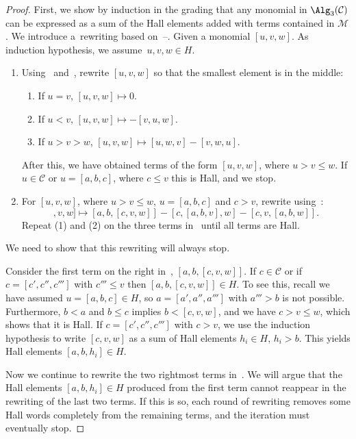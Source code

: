 \documentclass[pdftex]{sigma}
\numberwithin{equation}{section}
\begin{document}
\begin{proof}
First, we show by induction in the grading that any monomial in $\Alg_3(\mathcal{C})$ can be expressed as a sum of the Hall elements added with terms contained in $\mathcal{M}$.
We introduce a~rewriting based on~--.
Given a monomial $[u,v,w]$. As induction hypothesis, we assume~$u,v,w\in H$.
\begin{enumerate}\itemsep=0pt
\item[(1)] Using~ and~, rewrite $[u,v,w]$ so that the smallest element is in the middle:
 \begin{enumerate}\itemsep=0pt
 \item If $u=v$, $[u,v,w]\mapsto 0$.
 \item If $u<v$, $[u,v,w]\mapsto -[v,u,w]$.
 \item If $u>v> w$, $[u,v,w] \mapsto [u,w,v]-[v,w,u]$.
 \end{enumerate}
 After this, we have obtained terms of the form $[u,v,w]$, where $u>v\leq w$. If $u\in \mathcal{C}$ or $u=[a,b,c]$, where $c\leq v$ this is Hall, and we stop.
\item[(2)] For $[u,v,w]$, where $u>v\leq w$, $u=[a,b,c]$ and $c>v$, rewrite using~:
\begin{equation}
[[a,b,c],v,w] \mapsto [a,b,[c,v,w]] - [c,[a,b,v],w] - [c,v,[a,b,w]]. \label{eq:rewrite2}
\end{equation}
Repeat (1) and (2) on the three terms in~ until all terms are Hall.
\end{enumerate}
We need to show that this rewriting will always stop.

Consider the first term on the right in~, $[a,b,[c,v,w]]$.
If $c\in \mathcal{C}$ or if $c=[c',c'',c''']$ with $c'''\leq v$ then $[a,b,[c,v,w]]\in H$. To see this, recall we have assumed $u=[a,b,c]\in H$, so $a = [a',a'',a''']$ with $a'''>b$ is not possible. Furthermore, $b<a$ and $b\leq c$ implies $b< [c,v,w]$, and we have $c>v\leq w$, which shows that it is Hall. If $c=[c',c'',c''']$ with $c> v$, we use the induction hypothesis to write $[c,v,w]$ as a sum of
Hall elements $h_i\in H$, $h_i>b$. This yields Hall elements $[a,b,h_i]\in H$.

Now we continue to rewrite the two rightmost terms in~. We will argue that the Hall elements
$[a,b,h_i]\in H$ produced from the first term cannot reappear in the rewriting of the last two terms. If this is so, each round of rewriting removes some Hall words completely from the remaining terms, and the iteration must eventually stop.


\end{proof}
\end{document}
